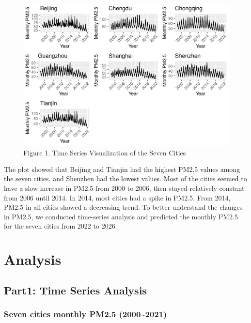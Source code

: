 \documentclass[
  12pt,
]{article}
\begin{document}
\begin{figure}
\centering
\includegraphics{LiFangRenZhang_ENV872_Project_files/figure-latex/TSA Visualization-1.pdf}
\caption{Figure 1. Time Series Visualization of the Seven Cities}
\end{figure}

The plot showed that Beijing and Tianjin had the highest PM2.5 values
among the seven cities, and Shenzhen had the lowest values. Most of the
cities seemed to have a slow increase in PM2.5 from 2000 to 2006, then
stayed relatively constant from 2006 until 2014. In 2014, most cities
had a spike in PM2.5. From 2014, PM2.5 in all cities showed a decreasing
trend. To better understand the changes in PM2.5, we conducted
time-series analysis and predicted the monthly PM2.5 for the seven
cities from 2022 to 2026.

\newpage

\hypertarget{analysis}{%
\section{Analysis}\label{analysis}}

\hypertarget{part1-time-series-analysis}{%
\subsection{Part1: Time Series
Analysis}\label{part1-time-series-analysis}}

\hypertarget{seven-cities-monthly-pm2.5-20002021}{%
\subsubsection{Seven cities monthly PM2.5
(2000\textasciitilde2021)}\label{seven-cities-monthly-pm2.5-20002021}}
\end{document}

